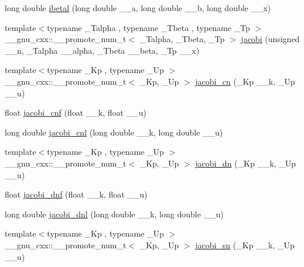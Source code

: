 \begin{DoxyCompactItemize}
\item 
long double \hyperlink{namespace____gnu__cxx_a5c9c5b583e4f1c9785a1c4582551c97f}{ibetal} (long double \+\_\+\+\_\+a, long double \+\_\+\+\_\+b, long double \+\_\+\+\_\+x)
\item 
{\footnotesize template$<$typename \+\_\+\+Talpha , typename \+\_\+\+Tbeta , typename \+\_\+\+Tp $>$ }\\\+\_\+\+\_\+gnu\+\_\+cxx\+::\+\_\+\+\_\+promote\+\_\+num\+\_\+t$<$ \+\_\+\+Talpha, \+\_\+\+Tbeta, \+\_\+\+Tp $>$ \hyperlink{namespace____gnu__cxx_ac7be4bf3c7588f932ce754ee340d0338}{jacobi} (unsigned \+\_\+\+\_\+n, \+\_\+\+Talpha \+\_\+\+\_\+alpha, \+\_\+\+Tbeta \+\_\+\+\_\+beta, \+\_\+\+Tp \+\_\+\+\_\+x)
\item 
{\footnotesize template$<$typename \+\_\+\+Kp , typename \+\_\+\+Up $>$ }\\\+\_\+\+\_\+gnu\+\_\+cxx\+::\+\_\+\+\_\+promote\+\_\+num\+\_\+t$<$ \+\_\+\+Kp, \+\_\+\+Up $>$ \hyperlink{namespace____gnu__cxx_aa49fc22cc0f9dde812bab5147fad23ca}{jacobi\+\_\+cn} (\+\_\+\+Kp \+\_\+\+\_\+k, \+\_\+\+Up \+\_\+\+\_\+u)
\item 
float \hyperlink{namespace____gnu__cxx_adbd6320123f45ae10d539cf8df0373cd}{jacobi\+\_\+cnf} (float \+\_\+\+\_\+k, float \+\_\+\+\_\+u)
\item 
long double \hyperlink{namespace____gnu__cxx_a08892965ea520116cc53a764513fe685}{jacobi\+\_\+cnl} (long double \+\_\+\+\_\+k, long double \+\_\+\+\_\+u)
\item 
{\footnotesize template$<$typename \+\_\+\+Kp , typename \+\_\+\+Up $>$ }\\\+\_\+\+\_\+gnu\+\_\+cxx\+::\+\_\+\+\_\+promote\+\_\+num\+\_\+t$<$ \+\_\+\+Kp, \+\_\+\+Up $>$ \hyperlink{namespace____gnu__cxx_a2be54b9c153b58a85d5ed9f1d0a02e21}{jacobi\+\_\+dn} (\+\_\+\+Kp \+\_\+\+\_\+k, \+\_\+\+Up \+\_\+\+\_\+u)
\item 
float \hyperlink{namespace____gnu__cxx_ae96327d678adc6b5c4051f1c3649549a}{jacobi\+\_\+dnf} (float \+\_\+\+\_\+k, float \+\_\+\+\_\+u)
\item 
long double \hyperlink{namespace____gnu__cxx_ae59786991abbf8359deef49b6323065a}{jacobi\+\_\+dnl} (long double \+\_\+\+\_\+k, long double \+\_\+\+\_\+u)
\item 
{\footnotesize template$<$typename \+\_\+\+Kp , typename \+\_\+\+Up $>$ }\\\+\_\+\+\_\+gnu\+\_\+cxx\+::\+\_\+\+\_\+promote\+\_\+num\+\_\+t$<$ \+\_\+\+Kp, \+\_\+\+Up $>$ \hyperlink{namespace____gnu__cxx_ad7e60d39a8b57a427eb8ca31c8d09e10}{jacobi\+\_\+sn} (\+\_\+\+Kp \+\_\+\+\_\+k, \+\_\+\+Up \+\_\+\+\_\+u)

\end{DoxyCompactItemize}
